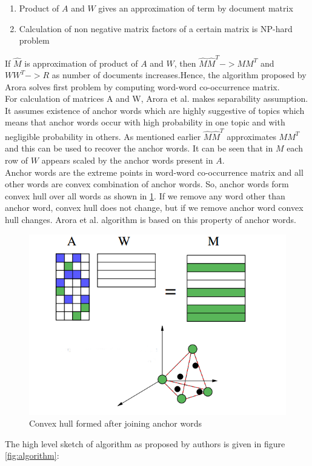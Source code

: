 \documentclass[a4paper,11pt]{article}
\begin{document}
\begin{enumerate}
\item Product of $A$ and $W$ gives an approximation of term by document matrix  
\item Calculation of non negative matrix factors of a certain matrix is NP-hard problem
\end{enumerate}

If $\hat{M}$  is approximation of product of $A$ and $W$, then $\hat{M} \hat{M}^T -> M M^T $ and $W W^T -> R$ as number of documents increases.Hence, the algorithm proposed by Arora solves first problem by computing word-word co-occurrence matrix. \\

For calculation of matrices A and W, Arora et al. \cite{tm} makes separability assumption. It assumes existence of anchor words which are highly suggestive of topics which means that anchor words occur with high probability in one topic and with negligible probability in others. As mentioned earlier $\hat{M} \hat{M}^T$ approximates $M M^T $ and this can be used to recover the anchor words. It can be seen that in $M$ each row of $W$ appears scaled by the anchor words present in $A$. \\

Anchor words are the extreme points in word-word co-occurrence matrix and all other words are convex combination of anchor words. So, anchor words form convex hull over all words as shown in \ref{fig:convexhull}. If we remove any word other than anchor word, convex hull does not change, but if we remove anchor word convex hull changes. Arora et al. \cite{tm} algorithm is based on this property of anchor words. \\



\begin{figure}[htb]
\centering
\includegraphics[scale=0.4]{convexhull.png}
\caption{Convex hull formed after joining anchor words \cite{tm}}
\label{fig:convexhull}
\end{figure}
The high level sketch of algorithm as proposed by authors \cite{tm} is given in figure \ref{fig:algorithm}:
\end{document}
